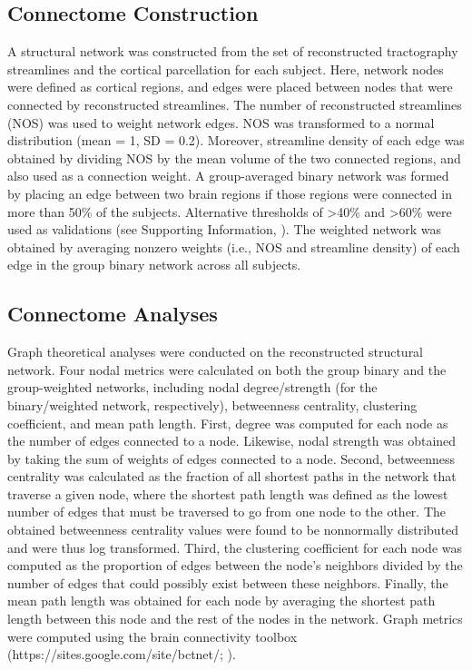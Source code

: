 \begin{refsection}
\subsection*{Connectome Construction}
A structural network was constructed from the set of reconstructed tractography streamlines and the cortical parcellation for each subject. Here, network nodes were defined as cortical regions, and edges were placed between nodes that were connected by reconstructed streamlines. The number of reconstructed streamlines (NOS) was used to weight network edges. NOS was transformed to a normal distribution (mean = 1, SD = 0.2). Moreover, streamline density of each edge was obtained by dividing NOS by the mean volume of the two connected regions, and also used as a connection weight. A group-averaged binary network was formed by placing an edge between two brain regions if those regions were connected in more than 50\% of the subjects. Alternative thresholds of >40\% and >60\% were used as validations (see Supporting Information, \citet{WEI2019bigbrain}). The weighted network was obtained by averaging nonzero weights (i.e., NOS and streamline density) of each edge in the group binary network across all subjects.

\subsection*{Connectome Analyses}
Graph theoretical analyses were conducted on the reconstructed structural network. Four nodal metrics were calculated on both the group binary and the group-weighted networks, including nodal degree/strength (for the binary/weighted network, respectively), betweenness centrality, clustering coefficient, and mean path length. First, degree was computed for each node as the number of edges connected to a node. Likewise, nodal strength was obtained by taking the sum of weights of edges connected to a node. Second, betweenness centrality was calculated as the fraction of all shortest paths in the network that traverse a given node, where the shortest path length was defined as the lowest number of edges that must be traversed to go from one node to the other. The obtained betweenness centrality values were found to be nonnormally distributed and were thus log transformed. Third, the clustering coefficient for each node was computed as the proportion of edges between the node’s neighbors divided by the number of edges that could possibly exist between these neighbors. Finally, the mean path length was obtained for each node by averaging the shortest path length between this node and the rest of the nodes in the network. Graph metrics were computed using the brain connectivity toolbox (https://sites.google.com/site/bctnet/; \citet{RUBINOV20101059}).



\end{refsection}
